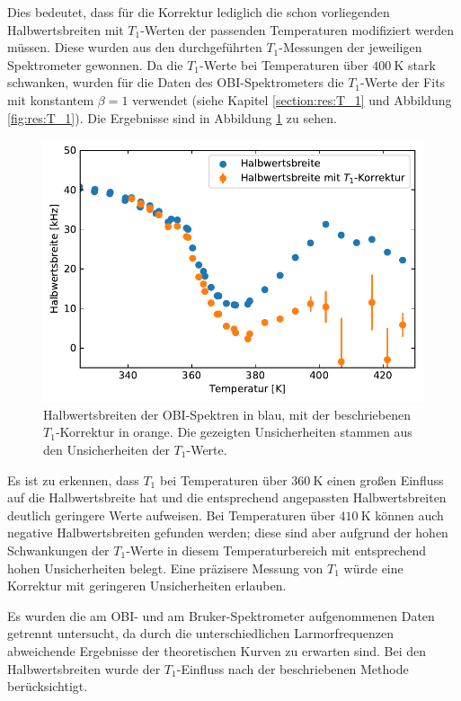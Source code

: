 Dies bedeutet, dass für die Korrektur lediglich die schon vorliegenden Halbwertsbreiten mit $T_1$-Werten der passenden Temperaturen modifiziert werden müssen. Diese wurden aus den durchgeführten $T_1$-Messungen der jeweiligen Spektrometer gewonnen. Da die $T_1$-Werte bei Temperaturen über $\SI{400}{\kelvin}$ stark schwanken, wurden für die Daten des OBI-Spektrometers die $T_1$-Werte der Fits mit konstantem $\beta = 1$ verwendet (siehe Kapitel \ref{section:res:T_1} und Abbildung \ref{fig:res:T_1}). Die Ergebnisse sind in Abbildung \ref{fig:res:spek_fwhm_t1} zu sehen.
\begin{figure}
	\begin{center}
		\includegraphics[width=.8\textwidth]{graphics/plot/fwhm_t1.pdf}
	\end{center}
	\caption{Halbwertsbreiten der OBI-Spektren in blau, mit der beschriebenen $T_1$-Korrektur in orange. Die gezeigten Unsicherheiten stammen aus den Unsicherheiten der $T_1$-Werte.} \label{fig:res:spek_fwhm_t1}
\end{figure}

Es ist zu erkennen, dass $T_1$ bei Temperaturen über $\SI{360}{\kelvin}$ einen großen Einfluss auf die Halbwertsbreite hat und die entsprechend angepassten Halbwertsbreiten deutlich geringere Werte aufweisen. Bei Temperaturen über $\SI{410}{\kelvin}$ können auch negative Halbwertsbreiten gefunden werden; diese sind aber aufgrund der hohen Schwankungen der $T_1$-Werte in diesem Temperaturbereich mit entsprechend hohen Unsicherheiten belegt. Eine präzisere Messung von $T_1$ würde eine Korrektur mit geringeren Unsicherheiten erlauben.




Es wurden die am OBI- und am Bruker-Spektrometer aufgenommenen Daten getrennt untersucht, da durch die unterschiedlichen Larmorfrequenzen abweichende Ergebnisse der theoretischen Kurven zu erwarten sind. Bei den Halbwertsbreiten wurde der $T_1$-Einfluss nach der beschriebenen Methode berücksichtigt.



